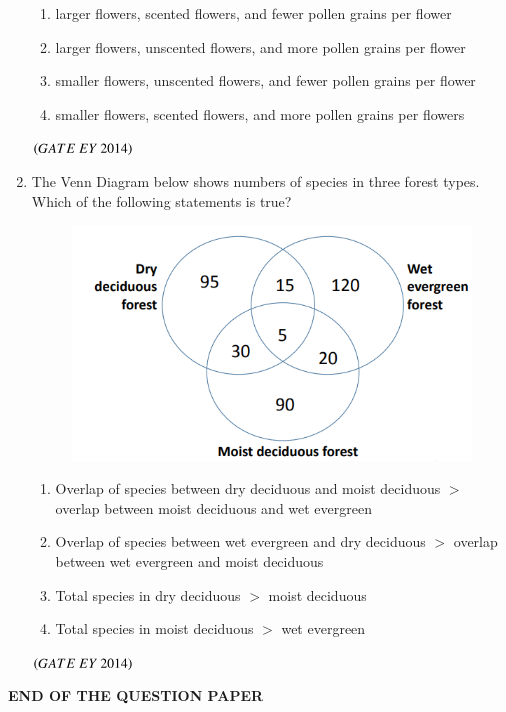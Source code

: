 \documentclass[journal]{IEEEtran}
\numberwithin{equation}{enumi}
\numberwithin{figure}{enumi}
\begin{document}
\begin{enumerate}
    \begin{enumerate}
        \item larger flowers, scented flowers, and fewer pollen grains per flower
        \item larger flowers, unscented flowers, and more pollen grains per flower
        \item smaller flowers, unscented flowers, and fewer pollen grains per flower
        \item smaller flowers, scented flowers, and more pollen grains per flowers
    \end{enumerate}
    \hfill{$\brak{ GATE\ EY\ 2014}$}
   \\
    \item The Venn Diagram below shows numbers of species in three forest types. Which of the following statements is true?
    \begin{figure}[H]
    \centering
    \includegraphics[width=0.4\columnwidth]{figs/20.png}
    \caption{}
    \label{fig:20}
   \end{figure}
    \begin{enumerate}
        \item Overlap of species between dry deciduous and moist deciduous $>$ overlap between moist deciduous and wet evergreen
        \item Overlap of species between wet evergreen and dry deciduous $>$ overlap between wet evergreen and moist deciduous
        \item Total species in dry deciduous $>$ moist deciduous
        \item Total species in moist deciduous $>$ wet evergreen
    \end{enumerate}
    \hfill{$\brak{ GATE\ EY\ 2014}$}
    \bigskip
    
\end{enumerate}
\begin{center}
\Large
\textbf{END OF THE QUESTION PAPER}
\end{center}
\end{document}
